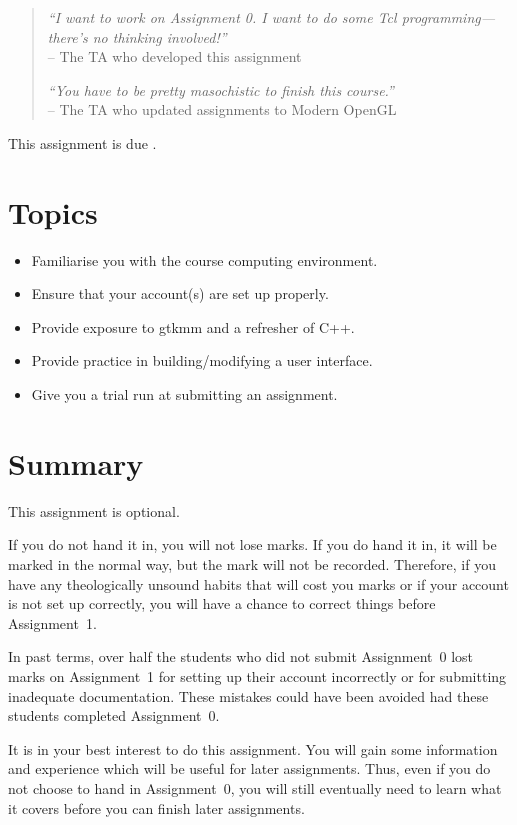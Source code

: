 \begin{quote}
        {\sl 
        ``I want to work on Assignment 0.  I want to do some Tcl
        programming---there's no thinking involved!''
        } \\
        \mbox{}\hfill -- The TA who developed this assignment
        
        {\sl 
        ``You have to be pretty masochistic to finish this course.''
        } \\
        \mbox{}\hfill -- The TA who updated assignments to Modern OpenGL
\end{quote}

This assignment is due {\bf \AzeroDeadline}.
\section{Topics}
\begin{itemize}
\item Familiarise you with the course computing environment.
\item Ensure that your account(s) are set up properly.
\item Provide exposure to gtkmm and a refresher of C++.
\item Provide practice in building/modifying a user interface.
\item Give you a trial run at submitting an assignment.
\end{itemize}

\section{Summary}
This assignment is optional.

If you do not hand it in, you will not lose
marks.  If you do hand it in, it will be marked in the normal way, but the
mark will not be recorded.  
Therefore, if you have any theologically unsound habits that
will cost you marks or if your account is not set up correctly, you will
have a chance to correct things before Assignment~1.   

In past terms, over half the students who did not submit Assignment~0
lost marks on Assignment~1 for setting up their account incorrectly
or for submitting inadequate documentation.  These mistakes could have
been avoided had these students completed Assignment~0.

It is in your best interest to do this assignment.  
You will gain some information and experience which will be
useful for later assignments.  Thus, even if you do not
choose to hand in Assignment~0, you will still eventually need to learn 
what it covers before you can finish later assignments.

